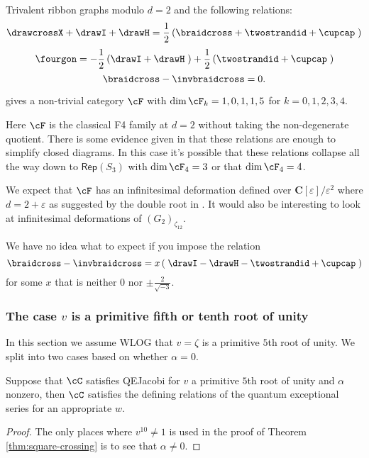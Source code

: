 \documentclass[12pt]{amsart}
\begin{document}
\begin{conjecture}
Trivalent ribbon graphs modulo $d=2$ and the following relations:
$$\drawcrossX + \drawI + \drawH = \frac{1}{2} \left(\braidcross + \twostrandid + \cupcap \;\right)$$
$$\fourgon = -\frac{1}{2} \left(\drawI + \drawH \;\right) + \frac{1}{2} \left(\twostrandid + \cupcap\;\right)$$
$$\braidcross - \invbraidcross = 0.$$

gives a non-trivial category $\cF$ with $\dim \cF_k = 1,0,1,1,5$ for $k = 0,1,2,3,4$.
\end{conjecture}

Here $\cF$ is the classical F4 family at $d=2$ without taking the 
non-degenerate quotient.  There is some evidence given in \cite{F4E6} that these
relations are enough to simplify closed diagrams.  In this case it's possible
that these relations collapse all the way down to $\mathsf{Rep}(S_3)$ with
$\dim \cF_4 = 3$ or that $\dim \cF_4 = 4$.

\begin{remark}
We expect that $\cF$ has an infinitesimal deformation defined over
$\mathbf{C}[\varepsilon]/\varepsilon^2$ where $d = 2+\varepsilon$ as suggested
by the double root in \cite[p. 3]{F4E6}.  It would also be interesting to look at infinitesimal deformations of $(G_2)_{\zeta_{12}}$.
\end{remark}

We have no idea what to expect if you impose the relation
$$\braidcross - \invbraidcross = x \left(\;\drawI - \drawH - \twostrandid + \cupcap \; \right)$$ 
for some $x$ that is neither $0$ nor $\pm \frac{2}{\sqrt{-3}}$.


\subsubsection{The case \texorpdfstring{$v$}{v} is a primitive fifth or tenth root of unity}

In this section we assume WLOG that $v = \zeta$ is a primitive $5$th root of unity.  We split into two cases based on whether $\alpha = 0$.

\begin{proposition}
Suppose that $\cC$ satisfies QEJacobi for $v$ a primitive $5$th root of unity and $\alpha$ nonzero, then $\cC$ satisfies the defining relations of the quantum exceptional series for an appropriate $w$.
\end{proposition}
\begin{proof}
The only places where $v^{10} \neq 1$ is used in the proof of Theorem \ref{thm:square-crossing} is to see that $\alpha \neq 0$.
\end{proof}
\end{document}
